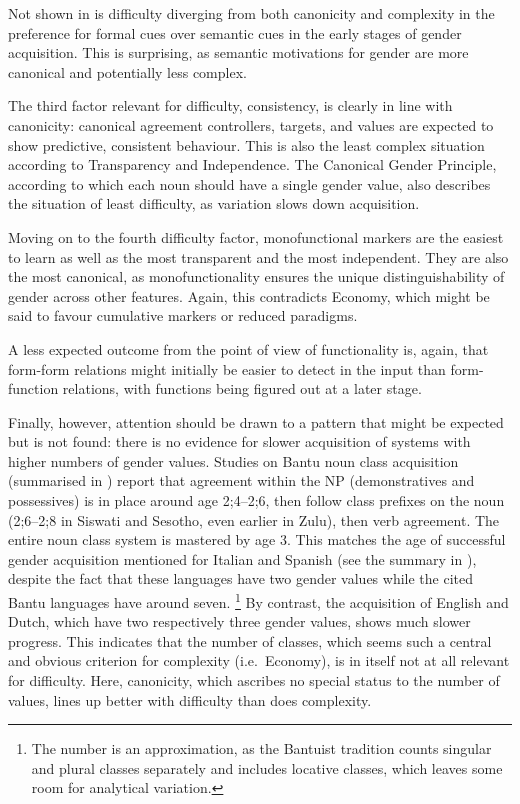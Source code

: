 \documentclass[output=collectionpaper]{langsci/langscibook}
\begin{document}
Not shown in  is difficulty diverging from both canonicity and complexity in the preference for formal cues over semantic cues in the early stages of gender acquisition. This is surprising, as semantic motivations for gender are more canonical and potentially less complex.

The third factor relevant for difficulty, consistency, is clearly in line with canonicity: canonical agreement controllers, targets, and values are expected to show predictive, consistent behaviour. This is also the least complex situation according to Transparency and Independence. The Canonical Gender Principle, according to which each noun should have a single gender value, also describes the situation of least difficulty, as variation slows down acquisition.

Moving on to the fourth difficulty factor, monofunctional markers are the easiest to learn as well as the most transparent and the most independent. They are also the most canonical, as monofunctionality ensures the unique distinguishability of gender across other features. Again, this contradicts Economy, which might be said to favour cumulative markers or reduced paradigms.

A less expected outcome from the point of view of functionality is, again, that form-form relations might initially be easier to detect in the input than form-function relations, with functions being figured out at a later stage.

Finally, however, attention should be drawn to a pattern that might be expected but is not found: there is no evidence for slower acquisition of systems with higher numbers of gender values. Studies on Bantu noun class acquisition (summarised in \citealt{Demuth2003}) report that agreement within the NP (demonstratives and possessives) is in place around age 2;4--2;6, then follow class prefixes on the noun (2;6--2;8 in Siswati and Sesotho, even earlier in Zulu), then verb agreement. The entire noun class system is mastered by age 3. This matches the age of successful gender acquisition mentioned for Italian and Spanish (see the summary in \citealt[556]{Eichler2013}), despite the fact that these languages have two gender values while the cited Bantu languages have around seven.%
\footnote{The number is an approximation, as the Bantuist tradition counts singular and plural classes separately and includes locative classes, which leaves some room for analytical variation.} %
By contrast, the acquisition of English and Dutch, which have two respectively three gender values, shows much slower progress. This indicates that the number of classes, which seems such a central and obvious criterion for complexity (i.e.\ Economy), is in itself not at all relevant for difficulty. Here, canonicity, which ascribes no special status to the number of values, lines up better with difficulty than does complexity.
\end{document}
